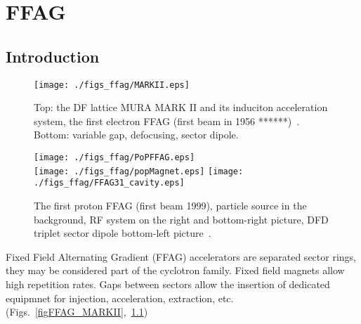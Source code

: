 



\chapter[FFAG]{FFAG}\label{chapFFAG}


\section{Introduction}\label{secFFAGIntro}


\begin{figure}[ht]
\sidebyside
{
  \begin{minipage}{.47\linewidth}
    \texttt{[image: ./figs\_ffag/MARKII.eps]}
    \caption{
  Top: the DF lattice MURA MARK II and its induciton acceleration system, the 
 first electron FFAG (first beam in 1956 ******)~\cite{BibFFAG-1}.
Bottom: variable gap, defocusing, sector dipole. 
    } 
    \label{figFFAG_MARKII}
   \end{minipage}
}{
  \begin{minipage}{.45\linewidth}
    \texttt{[image: ./figs\_ffag/PoPFFAG.eps]}\\
    \texttt{[image: ./figs\_ffag/popMagnet.eps]}
    \texttt{[image: ./figs\_ffag/FFAG31\_cavity.eps]}
    \caption{
    The first proton FFAG (first beam 1999), particle source 
 in the background, RF system on the right and bottom-right picture, 
DFD triplet sector dipole bottom-left picture~\cite{BibFFAG-2}. 
    }
    \label{figFFAG_POP}
   \end{minipage}
}
\end{figure}

 Fixed Field Alternating Gradient (FFAG) accelerators are separated sector rings, 
 they may be considered part of the cyclotron family. 
Fixed field magnets allow high repetition rates. 
  Gaps between sectors allow the insertion of dedicated equipmnet for injection, acceleration, extraction, etc.
(Figs.~\ref{figFFAG_MARKII},~\ref{figFFAG_POP})

